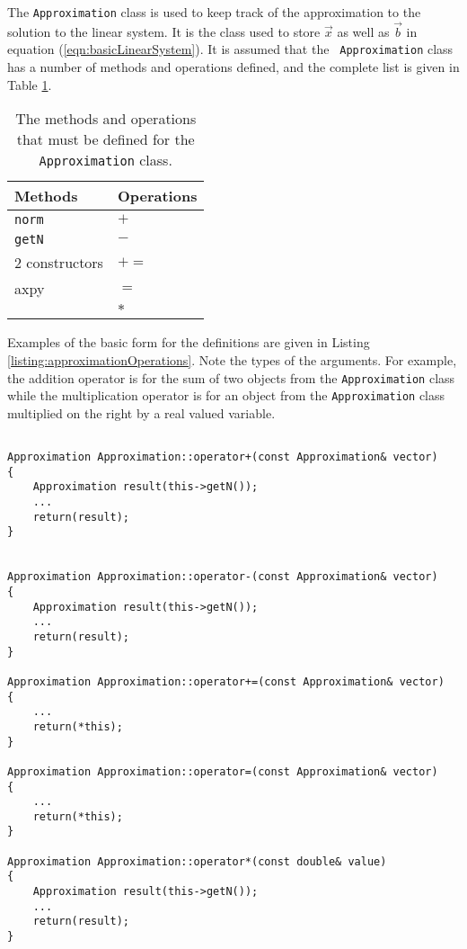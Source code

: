 The {\tt Approximation} class is used to keep track of the
approximation to the solution to the linear system. It is the class
used to store $\vec{x}$ as well as $\vec{b}$ in equation
(\ref{eqn:basicLinearSystem}). It is assumed that the {\tt
  Approximation} class has a number of methods and operations defined,
and the complete list is given in Table
\ref{tab:approximationOperations}.

\begin{table}
  \centering
  \begin{tabular}{l|l}
    Methods & Operations \\ \hline
    {\tt norm}     & $+$ \\
    {\tt getN}     & $-$ \\
    2 constructors & $+=$ \\
    axpy           & $=$ \\
                   & $*$
  \end{tabular}
  \caption{The methods and operations that must be defined for the {\tt Approximation} class.}
  \label{tab:approximationOperations}
\end{table}

Examples of the basic form for the definitions are given in Listing
\ref{listing:approximationOperations}. Note the types of the
arguments. For example, the addition operator is for the sum of two
objects from the {\tt Approximation} class while the multiplication
operator is for an object from the {\tt Approximation} class
multiplied on the right by a real valued variable.


\begin{lstlisting}[caption={An example of the operations that must be
    defined for the {\tt Approximation} class.},
                   basicstyle=\scriptsize,
                   label=listing:approximationOperations]

Approximation Approximation::operator+(const Approximation& vector)
{
	Approximation result(this->getN());
    ...
	return(result);
}


Approximation Approximation::operator-(const Approximation& vector)
{
	Approximation result(this->getN());
    ...
	return(result);
}

Approximation Approximation::operator+=(const Approximation& vector)
{
    ...
	return(*this);
}

Approximation Approximation::operator=(const Approximation& vector)
{
    ...
	return(*this);
}

Approximation Approximation::operator*(const double& value)
{
	Approximation result(this->getN());
    ...
	return(result);
}

\end{lstlisting}

